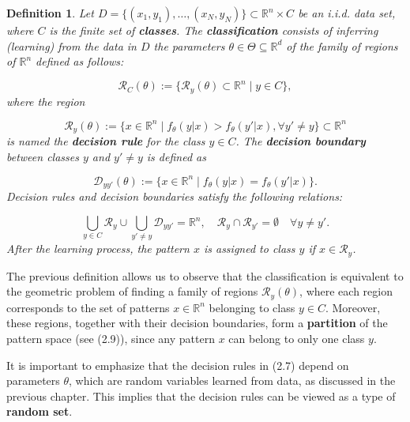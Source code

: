 \documentclass{report}
\newtheorem{definition}{Definition}[chapter]
\begin{document}
\begin{definition}
Let $D = \{(x_1,y_1),\dots,(x_N,y_N)\} \subset \mathbb{R}^n \times C$ be an i.i.d. data set, where $C$ is the finite set of \textbf{classes}. The \textbf{classification} consists of inferring (learning) from the data in $D$ the parameters $\theta \in \Theta \subseteq \mathbb{R}^d$ of the family of regions of $\mathbb{R}^n$ defined as follows:

\begin{equation}
\mathcal{R}_C(\theta) := \{\mathcal{R}_y(\theta) \subset \mathbb{R}^n \mid y \in C\},
\end{equation}
where the region

\begin{equation}
\mathcal{R}_y(\theta) := \{x \in \mathbb{R}^n \mid f_\theta(y|x) > f_\theta(y'|x), \forall y' \neq y\} \subset \mathbb{R}^n
\end{equation}
is named the \textbf{decision rule} for the class $y \in C$. The \textbf{decision boundary} between classes $y$ and $y' \neq y$ is defined as

\begin{equation}
\mathcal{D}_{yy'}(\theta) := \{x \in \mathbb{R}^n \mid f_\theta(y|x) = f_\theta(y'|x)\}.
\end{equation}
Decision rules and decision boundaries satisfy the following relations:

\begin{equation}
\bigcup_{y \in C} \mathcal{R}_y \cup \bigcup_{y' \neq y} \mathcal{D}_{yy'} = \mathbb{R}^n, \quad \mathcal{R}_y \cap \mathcal{R}_{y'} = \emptyset \quad \forall y \neq y'.
\end{equation}
After the learning process, the pattern $x$ is assigned to class $y$ if $x \in \mathcal{R}_y$.
\end{definition}
The previous definition allows us to observe that the classification is equivalent to the geometric problem of finding a family of regions $\mathcal{R}_y(\theta)$, where each region corresponds to the set of patterns $x \in \mathbb{R}^n$ belonging to class $y \in C$. Moreover, these regions, together with their decision boundaries, form a \textbf{partition} of the pattern space (see (2.9)), since any pattern $x$ can belong to only one class $y$.

It is important to emphasize that the decision rules in (2.7) depend on parameters $\theta$, which are random variables learned from data, as discussed in the previous chapter. This implies that the decision rules can be viewed as a type of \textbf{random set}.
\end{document}
